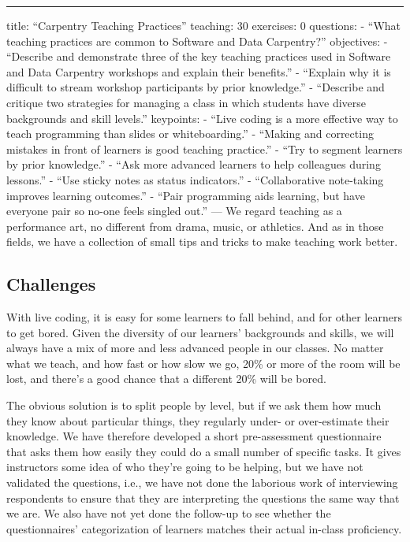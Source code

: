 \begin{center}
\rule{3in}{0.4pt}
\end{center}
title: ``Carpentry Teaching Practices''
teaching: 30
exercises: 0
questions:
- ``What teaching practices are common to Software and Data Carpentry?''
objectives:
- ``Describe and demonstrate three of the key teaching practices used in Software and Data Carpentry workshops and explain their benefits.''
- ``Explain why it is difficult to stream workshop participants by prior knowledge.''
- ``Describe and critique two strategies for managing a class in which students have diverse backgrounds and skill levels.''
keypoints:
- ``Live coding is a more effective way to teach programming than slides or whiteboarding.''
- ``Making and correcting mistakes in front of learners is good teaching practice.''
- ``Try to segment learners by prior knowledge.''
- ``Ask more advanced learners to help colleagues during lessons.''
- ``Use sticky notes as status indicators.''
- ``Collaborative note-taking improves learning outcomes.''
- ``Pair programming aids learning, but have everyone pair so no-one feels singled out.''
---
We regard teaching as a performance art,
no different from drama, music, or athletics.
And as in those fields,
we have a collection of small tips and tricks to make teaching work better.

\subsection*{Challenges}

With live coding, it is easy for some learners to fall behind, and for other
learners to get bored.  Given the diversity of our learners' backgrounds and skills, we will
always have a mix of more and less advanced people in our classes.  No
matter what we teach, and how fast or how slow we go, 20\% or more of
the room will be lost, and there's a good chance that a different 20\%
will be bored.

The obvious solution is to split people by level,
but if we ask them how much they know about particular things,
they regularly under- or over-estimate their knowledge.
We have therefore developed a short pre-assessment questionnaire
that asks them how easily they could do a small number of specific tasks.
It gives instructors some idea of who they're going to be helping,
but we have not validated the questions,
i.e.,
we have not done the laborious work of interviewing respondents
to ensure that they are interpreting the questions the same way that we are.
We also have not yet done the follow-up to see
whether the questionnaires' categorization of learners
matches their actual in-class proficiency.

